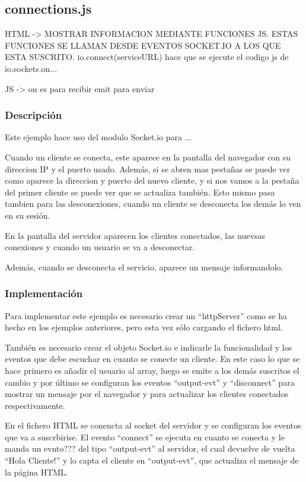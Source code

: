 \documentclass{article}
\begin{document}

\subsection{connections.js}
HTML -> MOSTRAR INFORMACION MEDIANTE FUNCIONES JS. ESTAS FUNCIONES SE LLAMAN DESDE EVENTOS SOCKET.IO A LOS QUE ESTA SUSCRITO. io.connect(serviceURL) hace que se ejecute el codigo js de io.sockets.on...

JS -> 
on es para recibir
emit para enviar
\subsubsection{Descripción}
Este ejemplo hace uso del modulo Socket.io para ...

Cuando un cliente se conecta, este aparece en la pantalla del navegador con su direccion IP y el puerto usado. Además, si se abren mas pestañas se puede ver como aparece la direccion y puerto del nuevo cliente, y si nos vamos a la pestaña del primer cliente se puede ver que se actualiza también. Esto mismo pasa tambien para las desconexiones, cuando un cliente se desconecta los demás lo ven en su sesión.

En la pantalla del servidor aparecen los clientes conectados, las nuevsas conexiones y cuando un usuario se va a desconectar.


Además, cuando se desconecta el servicio, aparece un mensaje informandolo.

\subsubsection{Implementación}
Para implementar este ejemplo es necesario crear un ``httpServer'' como se ha hecho en los ejemplos anteriores, pero esta vez sólo cargando el fichero html.

También es necesario crear el objeto Socket.io e indicarle la funcionalidad y los eventos que debe escuchar en cuanto se conecte un cliente. En este caso lo que se hace primero es añadir el usuario al array, luego se emite a los demás suscritos el cambio y por último se configuran los eventos ``output-evt'' y ``disconnect'' para mostrar un mensaje por el navegador y para actualizar los clientes conectados respectivamente.

En el fichero HTML se conencta al socket del servidor y se configuran los eventos que va a suscrbirise. El evento ``connect'' se ejecuta en cuanto se conecta y le manda un evnto??? del tipo ``output-evt'' al servidor, el cual devuelve de vuelta ``Hola Cliente!'' y lo capta el cliente en ``output-evt'', que actualiza el mensaje de la página HTML.
\end{document}
